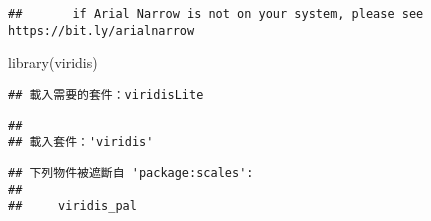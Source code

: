 \documentclass[
]{article}
\newenvironment{Shaded}{\begin{snugshade}}{\end{snugshade}}
\newcommand{\FunctionTok}[1]{\textcolor[rgb]{0.00,0.00,0.00}{#1}}
\newcommand{\NormalTok}[1]{#1}
\begin{document}
\begin{verbatim}
##       if Arial Narrow is not on your system, please see https://bit.ly/arialnarrow
\end{verbatim}

\begin{Shaded}
\begin{Highlighting}[]
\FunctionTok{library}\NormalTok{(viridis)}
\end{Highlighting}
\end{Shaded}

\begin{verbatim}
## 載入需要的套件：viridisLite
\end{verbatim}

\begin{verbatim}
## 
## 載入套件：'viridis'
\end{verbatim}

\begin{verbatim}
## 下列物件被遮斷自 'package:scales':
## 
##     viridis_pal
\end{verbatim}
\end{document}
